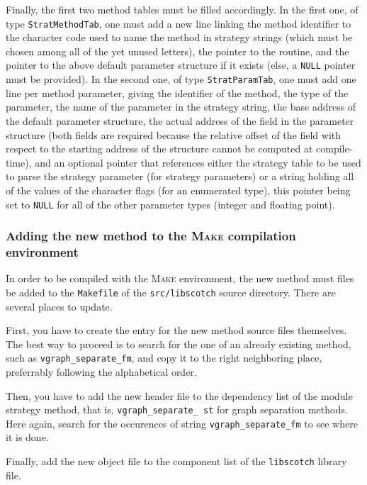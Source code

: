 Finally, the first two method tables must be filled accordingly. In the
first one, of type \texttt{Strat\lbt Method\lbt Tab}, one must add a new
line linking the method identifier to the character code used to name
the method in strategy strings (which must be chosen among all of
the yet unused letters), the pointer to the routine, and the pointer
to the above default parameter structure if it exists (else, a
\texttt{NULL} pointer must be provided).
In the second one, of type \texttt{Strat\lbt Param\lbt Tab}, one must add
one line per method parameter, giving the identifier of the method,
the type of the parameter, the name of the parameter in the strategy
string, the base address of the default parameter structure, the
actual address of the field in the parameter structure (both fields
are required because the relative offset of the field with respect to
the starting address of the structure cannot be computed at
compile-time), and an optional pointer that references either the
strategy table to be used to parse the strategy parameter (for
strategy parameters) or a string holding all of the values of the
character flags (for an enumerated type), this pointer being set to
\texttt{NULL} for all of the other parameter types (integer and floating
point).

\subsubsection{Adding the new method to the \textsc{Make} compilation environment}

In order to be compiled with the \textsc{Make} environment, the new
method must files be added to the \texttt{Makefile} of the
\texttt{src/\lbt libscotch} source directory. There are several places
to update.

First, you have to create the entry for the new method source files
themselves. The best way to proceed is to search for the one of an
already existing method, such as \texttt{vgraph\_\lbt separate\_\lbt fm},
and copy it to the right neighboring place, preferrably following the
alphabetical order.

Then, you have to add the new header file to the dependency list of
the module strategy method, that is, \texttt{vgraph\_\lbt separate\_\lbt
st} for graph separation methods. Here again, search for the
occurences of string \texttt{vgraph\_\lbt separate\_\lbt fm} to see where
it is done.

Finally, add the new object file to the component list of the
\texttt{libscotch} library file.


